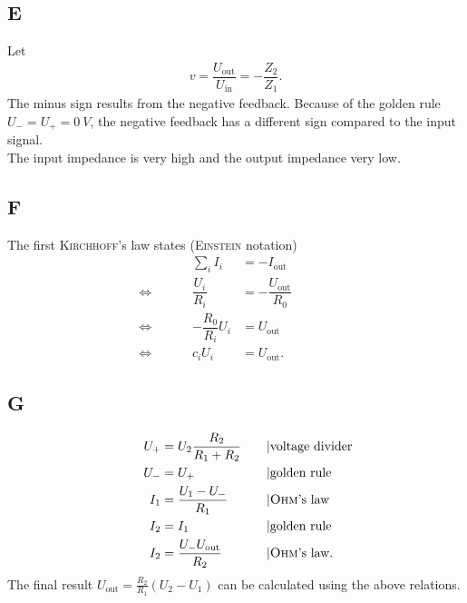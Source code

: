 \documentclass[a4paper,10pt]{article}
\numberwithin{equation}{section}
\begin{document}
\begin{multicols}{2}
        \subsection{E}
        Let
        \begin{align} 
                v=\dfrac{U_\text{out}}{U_\text{in}}=-\dfrac{Z_2}{Z_1}
        .\end{align} 
        The minus sign results from the negative feedback.
        Because of the golden rule $U_-=U_+=\SI{0}{V}$, the negative feedback has a different sign compared to the input signal.
        \\\indent The input impedance is very high and the output impedance very low. 

        \subsection{F} \label{pre:F}
        The first \textsc{Kirchhoff}'s law states (\textsc{Einstein} notation)
        \begin{align} 
                &&&& \sum_{i}^{}I_i &= -I_\text{out} &&&& \\
                \Leftrightarrow  &&&& \dfrac{U_i}{R_i} &= -\dfrac{U_\text{out}}{R_0}&&&& \\
                \Leftrightarrow  &&&& -\dfrac{R_0}{R_i}U_i &= U_\text{out} &&&& \\
                \Leftrightarrow  &&&& c_iU_i &= U_\text{out}. &&&& 
        \end{align} 
        
        \subsection{G} \label{pre:G}
        \begin{align} 
                &&&& U_+ &= U_2\dfrac{R_2}{R_1+R_2} &&&& |\text{voltage divider}\\
                &&&& U_- &= U_+ &&&& |\text{golden rule}\\
                &&&& I_1 &= \dfrac{U_1-U_-}{R_1} &&&& |\text{\textsc{Ohm}'s law}\\
                &&&& I_2 &= I_1 &&&& |\text{golden rule}\\
                &&&& I_2 &= \dfrac{U_-U_\text{out}}{R_2} &&&& |\text{\textsc{Ohm}'s law}
        .\end{align}
        The final result $U_\text{out}=\tfrac{R_2}{R_1}\left(U_2-U_1\right)$ can be calculated using the above relations.


\end{multicols}
\end{document}
